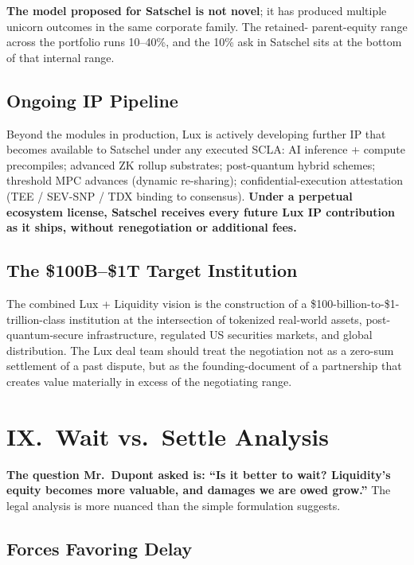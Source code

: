 \documentclass[11pt,letterpaper]{article}
\begin{document}
\textbf{The model proposed for Satschel is not novel}; it has produced
multiple unicorn outcomes in the same corporate family. The retained-
parent-equity range across the portfolio runs 10--40\%, and the 10\%
ask in Satschel sits at the bottom of that internal range.

\subsection*{Ongoing IP Pipeline}

Beyond the modules in production, Lux is actively developing further
IP that becomes available to Satschel under any executed SCLA:
AI inference + compute precompiles; advanced ZK rollup substrates;
post-quantum hybrid schemes; threshold MPC advances (dynamic
re-sharing); confidential-execution attestation (TEE / SEV-SNP / TDX
binding to consensus). \textbf{Under a perpetual ecosystem license,
Satschel receives every future Lux IP contribution as it ships,
without renegotiation or additional fees.}

\subsection*{The \$100B--\$1T Target Institution}

The combined Lux + Liquidity vision is the construction of a
\$100-billion-to-\$1-trillion-class institution at the intersection
of tokenized real-world assets, post-quantum-secure infrastructure,
regulated US securities markets, and global distribution. The Lux
deal team should treat the negotiation not as a zero-sum settlement
of a past dispute, but as the founding-document of a partnership
that creates value materially in excess of the negotiating range.

\section*{IX.\ Wait vs.\ Settle Analysis}

\textbf{The question Mr.\ Dupont asked is: ``Is it better to wait?
Liquidity's equity becomes more valuable, and damages we are owed
grow.''} The legal analysis is more nuanced than the simple
formulation suggests.

\subsection*{Forces Favoring Delay}
\end{document}
